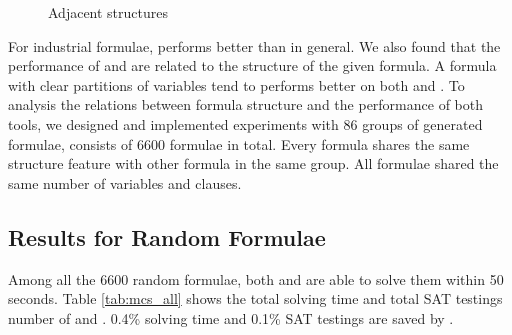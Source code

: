\begin{figure}[t]
\centering
{}
\caption{Adjacent structures}
\label{fig:cs}
\end{figure}

For industrial formulae, \tool performs better than \minibones in general. We also found that the performance of \tool and \minibones are related to the structure of the given formula. A formula with clear partitions of variables tend to performs better on both \tool and \minibones.
To analysis the relations between formula structure and the performance of both tools, we designed and implemented experiments with 86 groups of generated formulae, consists of 6600 formulae in total. Every formula shares the same structure feature with other formula in the same group. All formulae shared the same number of variables and clauses.

\subsection{Results for Random Formulae}
Among all the 6600 random formulae, both \tool and \minibones are able to solve them within 50 seconds. Table \ref{tab:mcs_all} shows the total solving time and total SAT testings number of \tool and \minibones. 0.4\% solving time and 0.1\% SAT testings are saved by \tool.

